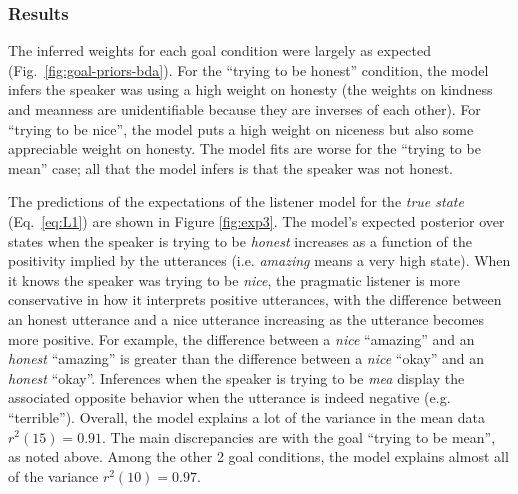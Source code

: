 \documentclass[10pt,letterpaper]{article}
\newcommand{\ndg}[1]{\textcolor{Green}{[ndg: #1]}}
\newcommand{\mht}[1]{\textcolor{DarkOrange}{[mht: #1]}}
\begin{document}
%




\subsubsection{Results}

The inferred weights for each goal condition were largely as expected (Fig.~\ref{fig:goal-priors-bda}).
For the ``trying to be honest'' condition, the model infers the speaker was using a high weight on honesty (the weights on kindness and meanness are unidentifiable because they are inverses of each other).
For ``trying to be nice'', the model puts a high weight on niceness but also some appreciable weight on honesty.
The model fits are worse for the ``trying to be mean'' case; all that the model infers is that the speaker was not honest.

The predictions of the expectations of the listener model for the \emph{true state} (Eq.~\ref{eq:L1}) are shown in Figure \ref{fig:exp3}.
The model's expected posterior over states when the speaker is trying to be \emph{honest} increases as a function of the positivity implied by the utterances (i.e. \emph{amazing} means a very high state).
When it knows the speaker was trying to be \emph{nice}, the pragmatic listener is more conservative in how it interprets positive utterances, with the difference between an honest utterance and a nice utterance increasing as the utterance becomes more positive. 
For example, the difference between a \emph{nice} ``amazing'' and an \emph{honest} ``amazing'' is greater than the difference between a \emph{nice} ``okay'' and an \emph{honest} ``okay''.
Inferences when the speaker is trying to be \emph{mea} display the associated opposite behavior when the utterance is indeed negative (e.g. ``terrible'').
Overall, the model explains a lot of the variance in the mean data $r^2(15) = 0.91$.
The main discrepancies are with the goal ``trying to be mean'', as noted above.
Among the other 2 goal conditions, the model explains almost all of the variance $r^2(10) = 0.97$.
\end{document}
